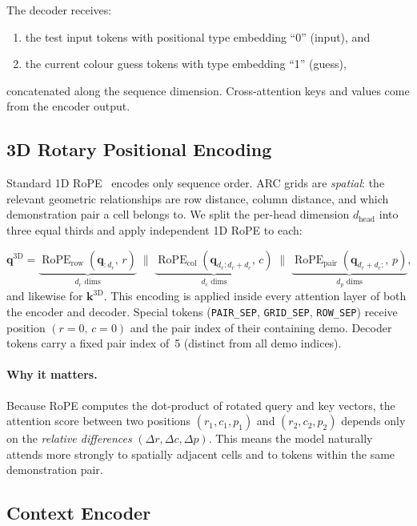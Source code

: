 \documentclass[11pt,a4paper]{article}
\begin{document}
\medskip\noindent The decoder receives:
\begin{enumerate}[noitemsep]
  \item the test input tokens with positional type embedding ``0'' (input), and
  \item the current colour guess tokens with type embedding ``1'' (guess),
\end{enumerate}
concatenated along the sequence dimension.  Cross-attention keys and values come from
the encoder output.

\subsection{3D Rotary Positional Encoding}
\label{ssec:rope}

Standard 1D RoPE~\cite{su2024roformer} encodes only sequence order.  ARC grids are
\emph{spatial}: the relevant geometric relationships are row distance, column distance,
and which demonstration pair a cell belongs to.  We split the per-head dimension
$d_{\text{head}}$ into three equal thirds and apply independent 1D RoPE to each:

\[
  \mathbf{q}^{\text{3D}} =
    \underbrace{\operatorname{RoPE}_{\text{row}}(\mathbf{q}_{:d_r},\, r)}_{d_r \text{ dims}}
    \;\|\;
    \underbrace{\operatorname{RoPE}_{\text{col}}(\mathbf{q}_{d_r:d_r+d_c},\, c)}_{d_c \text{ dims}}
    \;\|\;
    \underbrace{\operatorname{RoPE}_{\text{pair}}(\mathbf{q}_{d_r+d_c:},\, p)}_{d_p \text{ dims}},
\]
and likewise for $\mathbf{k}^{\text{3D}}$.  This encoding is applied inside every
attention layer of both the encoder and decoder.  Special tokens (\texttt{PAIR\_SEP},
\texttt{GRID\_SEP}, \texttt{ROW\_SEP}) receive position $(r{=}0,\,c{=}0)$ and the
pair index of their containing demo.  Decoder tokens carry a fixed pair index of~5
(distinct from all demo indices).

\paragraph{Why it matters.}  Because RoPE computes the dot-product of rotated query and
key vectors, the attention score between two positions $(r_1,c_1,p_1)$ and
$(r_2,c_2,p_2)$ depends only on the \emph{relative differences}
$(\Delta r, \Delta c, \Delta p)$.  This means the model naturally attends more strongly
to spatially adjacent cells and to tokens within the same demonstration pair.

\subsection{Context Encoder}
\end{document}
